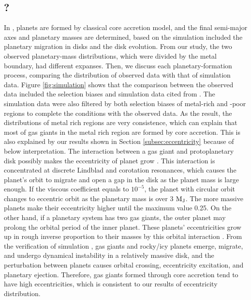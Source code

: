 \documentclass[twocolumn, dvipdfmx]{aastex62}
\begin{document}
\begin{CJK*}{UTF8}{min}
\subsection{?}

In \cite{2012A&A...541A..97M}, planets are formed by classical core accretion model, and the final semi-major axes and planetary masses are determined, based on the simulation included the planetary migration in disks and the disk evolution. From our study, the two observed planetary-mass distributions, which were divided by the metal boundary, had different expanses. Then, we discuss each planetary-formation process, comparing the distribution of observed data with that of simulation data. Figure \ref{fig:simulation} shows that the comparison between the observed data included the selection biases and simulation data cited from \cite{2012A&A...541A..97M}. The simulation data were also filtered by both selection biases of metal-rich and -poor regions to complete the conditions with the observed data. As the result, the distributions of metal rich regions are very consistence, which can explain that most of gas giants in the metal rich region are formed by core accretion. This is also explained by our results shown in Section \ref{subsec:eccentricity} because of below interpretation. The interaction between a gas giant and protoplanetary disk possibly makes the eccentricity of planet grow \citep{2003ApJ...585.1024G, 2006A&A...447..369K}. This interaction is concentrated at discrete Lindblad and corotation resonances, which causes the planet's orbit to migrate and open a gap in the disk as the planet mass is large enough. If the viscous coefficient equals to $10^{-5}$, the planet with circular orbit changes to eccentric orbit as the planetary mass is over 3 $\rm M_J$. The more massive planets make their eccentricity higher until the maximum value 0.25. On the other hand, if a planetary system has two gas giants, the outer planet may prolong the orbital period of the inner planet. These planets' eccentricities grow up in rough inverse proportion to their masses by this orbital interaction \citep{2002ApJ...564L.105C}. From the verification of simulation \citep{2013ApJ...775...42I}, gas giants and rocky/icy planets emerge, migrate, and undergo dynamical instability in a relatively massive disk, and the perturbation between planets causes orbital crossing, eccentricity excitation, and planetary ejection. Therefore, gas giants formed through core accretion tend to have high eccentricities, which is consistent to our results of eccentricity distribution.


\end{CJK*}
\end{document}
